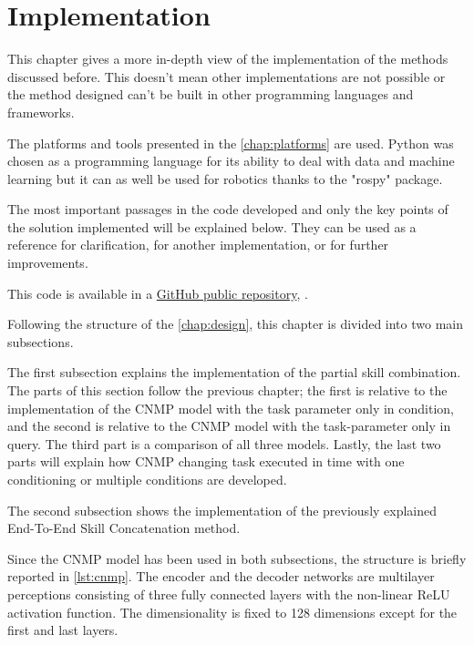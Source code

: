 \chapter{Implementation} 
\label{chap:implementation}

This chapter gives a more in-depth view of the implementation of the methods discussed before. This doesn't mean other implementations are not possible or the method designed can't be built in other programming languages and frameworks.

The platforms and tools presented in the \cref{chap:platforms} are used. Python was chosen as a programming language for its ability to deal with data and machine learning but it can as well be used for robotics thanks to the "rospy" package. 

The most important passages in the code developed and only the key points of the solution implemented will be explained below. They can be used as a reference for clarification, for another implementation, or for further improvements. 

This code is available in a \href{https://github.com/igor-lirussi/CNMP-Robotic-Skill-Synthesis}{GitHub public repository}, \cite{url:CNMPrepo}.

Following the structure of the \cref{chap:design}, this chapter is divided into two main subsections. 

The first subsection explains the implementation of the partial skill combination.
The parts of this section follow the previous chapter; the first is relative to the implementation of the CNMP model with the task parameter only in condition, and the second is relative to the CNMP model with the task-parameter only in query. The third part is a comparison of all three models. Lastly, the last two parts will explain how CNMP changing task executed in time with one conditioning or multiple conditions are developed.

The second subsection shows the implementation of the previously explained End-To-End Skill Concatenation method. 

Since the CNMP model has been used in both subsections, the structure is briefly reported in \cref{lst:cnmp}. The encoder and the decoder networks are multilayer perceptions consisting of three fully connected layers with the non-linear ReLU activation function. The dimensionality is fixed to 128 dimensions except for the first and last layers. 

